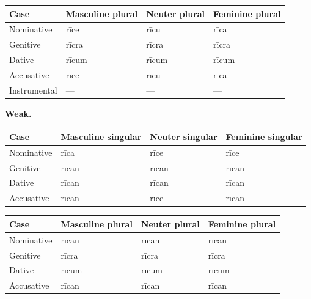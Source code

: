 \noindent
\begin{tabular}{@{}>{\raggedright\arraybackslash}p{22.0mm}>{\raggedright\arraybackslash}p{31.188mm}>{\raggedright\arraybackslash}p{31.188mm}>{\raggedright\arraybackslash}p{31.188mm}@{}}
\toprule
\textbf{Case} & \textbf{Masculine plural} & \textbf{Neuter plural} & \textbf{Feminine plural} \\
\midrule
Nominative & rīce & rīcu & rīca \\
Genitive & rīcra & rīcra & rīcra \\
Dative & rīcum & rīcum & rīcum \\
Accusative & rīce & rīcu & rīca \\
Instrumental & — & — & — \\
\bottomrule
\end{tabular}
\par\endgroup

\textbf{Weak.}

\par\begingroup
\fontsize{10.5}{13.2}\selectfont
\setlength{\LTleft}{0pt}\setlength{\LTright}{\fill}
\noindent
\begin{tabular}{@{}>{\raggedright\arraybackslash}p{22.0mm}>{\raggedright\arraybackslash}p{31.188mm}>{\raggedright\arraybackslash}p{31.188mm}>{\raggedright\arraybackslash}p{31.188mm}@{}}
\toprule
\textbf{Case} & \textbf{Masculine singular} & \textbf{Neuter singular} & \textbf{Feminine singular} \\
\midrule
Nominative & rīca & rīce & rīce \\
Genitive & rīcan & rīcan & rīcan \\
Dative & rīcan & rīcan & rīcan \\
Accusative & rīcan & rīce & rīcan \\
\bottomrule
\end{tabular}
\par\endgroup
\par\addvspace{5pt}
\par\begingroup
\fontsize{10.5}{13.2}\selectfont
\setlength{\LTleft}{0pt}\setlength{\LTright}{\fill}
\noindent
\begin{tabular}{@{}>{\raggedright\arraybackslash}p{22.0mm}>{\raggedright\arraybackslash}p{31.188mm}>{\raggedright\arraybackslash}p{31.188mm}>{\raggedright\arraybackslash}p{31.188mm}@{}}
\toprule
\textbf{Case} & \textbf{Masculine plural} & \textbf{Neuter plural} & \textbf{Feminine plural} \\
\midrule
Nominative & rīcan & rīcan & rīcan \\
Genitive & rīcra & rīcra & rīcra \\
Dative & rīcum & rīcum & rīcum \\
Accusative & rīcan & rīcan & rīcan \\
\bottomrule
\end{tabular}
\par\endgroup

